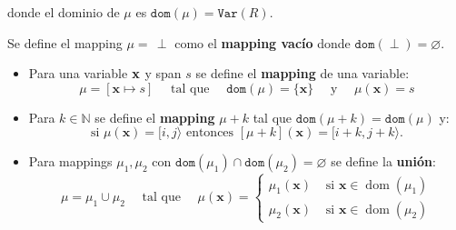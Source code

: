 donde el dominio de $\mu$ es $\texttt{dom}(\mu) = \texttt{Var}(R)$. \bigbreak

Se define el mapping $\mu = \, \perp$ como el \textbf{mapping vacío} donde $\texttt{dom}(\perp) = \varnothing$.


\begin{itemize}
    \item Para una variable $\mathbf{x}$ y span $s$ se define el \textbf{mapping} de una variable:
          $$
              \mu=[\mathbf{x} \mapsto s] \quad \text { tal que } \quad \texttt{dom}(\mu)=\{\mathbf{x}\} \quad \text { y } \quad \mu(\mathbf{x})=s
          $$

    \item Para $k \in \mathbb{N}$ se define el \textbf{mapping} $\mu + k$ tal que $\texttt{dom}(\mu + k) = \texttt{dom}(\mu)$ y:
          $$
              \text{si } \mu(\mathbf{x})=[i, j\rangle \text { entonces }[\mu+k](\mathbf{x})=[i+k, j+k\rangle \text {.}
          $$

    \item Para mappings $\mu_1,\mu_2$ con $\texttt{dom}(\mu_1) \cap \texttt{dom}(\mu_2) = \varnothing$ se define la \textbf{unión}:
          $$
              \mu=\mu_1 \cup \mu_2 \quad \text { tal que } \quad \mu(\mathbf{x})= \begin{cases}
                  \mu_1(\mathbf{x}) & \text { si } \mathbf{x} \in \operatorname{dom}\left(\mu_1\right) \\
                  \mu_2(\mathbf{x}) & \text { si } \mathbf{x} \in \operatorname{dom}\left(\mu_2\right)
              \end{cases}
          $$
\end{itemize}

